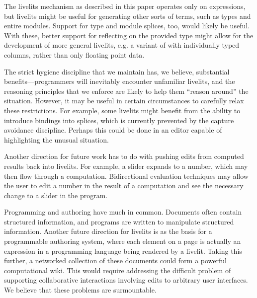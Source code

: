   The livelits mechanism as described in this paper operates only on expressions,
  but livelits might be useful for generating other sorts of terms, such as types
  and entire modules. Support for type and module splices, too, would likely be useful.
  With these, better support for reflecting on the provided type might allow for 
  the development of more general livelits, e.g. a variant of  
  with individually typed columns, rather than only floating point data.

  The strict hygiene discipline that we maintain has, we believe, substantial 
  benefits---programmers will inevitably encounter unfamiliar livelits, and 
  the reasoning principles that we enforce are likely to help them ``reason around''
  the situation. However, it may be useful in certain circumstances to carefully
  relax these restrictions. For example, some livelits might benefit from the 
  ability to introduce bindings into splices, which is currently prevented by 
  the capture avoidance discipline. Perhaps this could be done in an 
  editor capable of highlighting the unusual situation.

  Another direction for future work has to do with pushing edits from computed results
  back into livelits. For example, a slider expands to a number, which may 
  then flow through a computation. Bidirectional evaluation techniques may allow
  the user to edit a number in the result of a computation and see the necessary
  change to a slider in the program.

  Programming and authoring have much in common. Documents often contain structured
  information, and programs are written to manipulate structured information.
  Another future direction for livelits is as the basis for a programmable authoring 
  system, where each element on a page is actually an expression in a programming language
  being rendered by a livelit. Taking this further, a networked collection of these
  documents could form a powerful computational wiki. This would 
  require addressing the difficult problem of supporting collaborative interactions 
  involving edits to arbitrary user interfaces. 
  We believe that these problems are surmountable.


